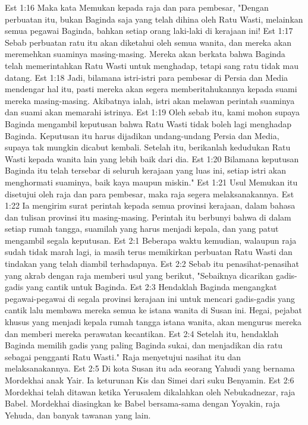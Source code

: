 Est 1:16  Maka kata Memukan kepada raja dan para pembesar, "Dengan perbuatan itu, bukan Baginda saja yang telah dihina oleh Ratu Wasti, melainkan semua pegawai Baginda, bahkan setiap orang laki-laki di kerajaan ini!
Est 1:17  Sebab perbuatan ratu itu akan diketahui oleh semua wanita, dan mereka akan meremehkan suaminya masing-masing. Mereka akan berkata bahwa Baginda telah memerintahkan Ratu Wasti untuk menghadap, tetapi sang ratu tidak mau datang.
Est 1:18  Jadi, bilamana istri-istri para pembesar di Persia dan Media mendengar hal itu, pasti mereka akan segera memberitahukannya kepada suami mereka masing-masing. Akibatnya ialah, istri akan melawan perintah suaminya dan suami akan memarahi istrinya.
Est 1:19  Oleh sebab itu, kami mohon supaya Baginda mengambil keputusan bahwa Ratu Wasti tidak boleh lagi menghadap Baginda. Keputusan itu harus dijadikan undang-undang Persia dan Media, supaya tak mungkin dicabut kembali. Setelah itu, berikanlah kedudukan Ratu Wasti kepada wanita lain yang lebih baik dari dia.
Est 1:20  Bilamana keputusan Baginda itu telah tersebar di seluruh kerajaan yang luas ini, setiap istri akan menghormati suaminya, baik kaya maupun miskin."
Est 1:21  Usul Memukan itu disetujui oleh raja dan para pembesar, maka raja segera melaksanakannya.
Est 1:22  Ia mengirim surat perintah kepada semua provinsi kerajaan, dalam bahasa dan tulisan provinsi itu masing-masing. Perintah itu berbunyi bahwa di dalam setiap rumah tangga, suamilah yang harus menjadi kepala, dan yang patut mengambil segala keputusan.
Est 2:1  Beberapa waktu kemudian, walaupun raja sudah tidak marah lagi, ia masih terus memikirkan perbuatan Ratu Wasti dan tindakan yang telah diambil terhadapnya.
Est 2:2  Sebab itu penasihat-penasihat yang akrab dengan raja memberi usul yang berikut, "Sebaiknya dicarikan gadis-gadis yang cantik untuk Baginda.
Est 2:3  Hendaklah Baginda mengangkat pegawai-pegawai di segala provinsi kerajaan ini untuk mencari gadis-gadis yang cantik lalu membawa mereka semua ke istana wanita di Susan ini. Hegai, pejabat khusus yang menjadi kepala rumah tangga istana wanita, akan mengurus mereka dan memberi mereka perawatan kecantikan.
Est 2:4  Setelah itu, hendaklah Baginda memilih gadis yang paling Baginda sukai, dan menjadikan dia ratu sebagai pengganti Ratu Wasti." Raja menyetujui nasihat itu dan melaksanakannya.
Est 2:5  Di kota Susan itu ada seorang Yahudi yang bernama Mordekhai anak Yair. Ia keturunan Kis dan Simei dari suku Benyamin.
Est 2:6  Mordekhai telah ditawan ketika Yerusalem dikalahkan oleh Nebukadnezar, raja Babel. Mordekhai diasingkan ke Babel bersama-sama dengan Yoyakin, raja Yehuda, dan banyak tawanan yang lain.
